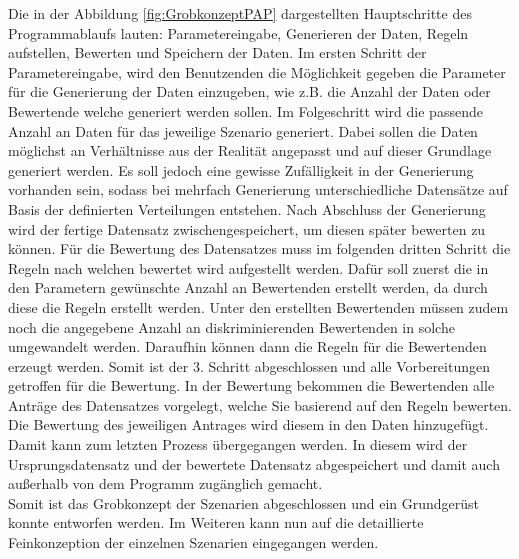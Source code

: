 \begin{onehalfspace}
Die in der Abbildung \ref{fig:GrobkonzeptPAP} dargestellten Hauptschritte des Programmablaufs lauten: Parametereingabe, Generieren der Daten, Regeln aufstellen, Bewerten und Speichern der Daten. Im ersten Schritt der Parametereingabe, wird den Benutzenden die Möglichkeit gegeben die Parameter für die Generierung der Daten einzugeben, wie z.B. die Anzahl der Daten oder Bewertende welche generiert werden sollen. Im Folgeschritt wird die passende Anzahl an Daten für das jeweilige Szenario generiert. Dabei sollen die Daten möglichst an Verhältnisse aus der Realität angepasst und auf dieser Grundlage generiert werden. Es soll jedoch eine gewisse Zufälligkeit in der Generierung vorhanden sein, sodass bei mehrfach Generierung unterschiedliche Datensätze auf Basis der definierten Verteilungen entstehen. Nach Abschluss der Generierung wird der fertige Datensatz zwischengespeichert, um diesen später bewerten zu können. Für die Bewertung des Datensatzes muss im folgenden dritten Schritt die Regeln nach welchen bewertet wird aufgestellt werden. Dafür soll zuerst die in den Parametern gewünschte Anzahl an Bewertenden erstellt werden, da durch diese die Regeln erstellt werden. Unter den erstellten Bewertenden müssen zudem noch die angegebene Anzahl an diskriminierenden Bewertenden in solche umgewandelt werden. Daraufhin können dann die Regeln für die Bewertenden erzeugt werden. Somit ist der 3. Schritt abgeschlossen und alle Vorbereitungen getroffen für die Bewertung. In der Bewertung bekommen die Bewertenden alle Anträge des Datensatzes vorgelegt, welche Sie basierend auf den Regeln bewerten. Die Bewertung des jeweiligen Antrages wird diesem in den Daten hinzugefügt. Damit kann zum letzten Prozess übergegangen werden. In diesem wird der Ursprungsdatensatz und der bewertete Datensatz abgespeichert und damit auch außerhalb von dem Programm zugänglich gemacht.\\
Somit ist das Grobkonzept der Szenarien abgeschlossen und ein Grundgerüst konnte entworfen werden. Im Weiteren kann nun auf die detaillierte Feinkonzeption der einzelnen Szenarien eingegangen werden.

\end{onehalfspace}
